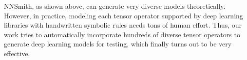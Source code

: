 \documentclass{article}
\begin{document}
NNSmith, as shown above, can generate very diverse models theoretically. However, in practice, modeling each tensor operator supported by deep learning libraries with handwritten symbolic rules needs tons of human effort. Thus, our work tries to automatically incorporate hundreds of diverse tensor operators to generate deep learning models for testing, which finally turns out to be very effective.
\end{document}

